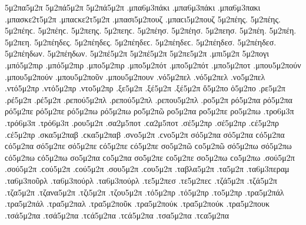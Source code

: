 {5μ2πα5μ2π   %
5μ2πά5μ2π 5μ2πά5μ2π   %
.μπα6μ3πάκι .μπα6μ3πάκι   %
.μπα6μ3πακι
.μπασκε2τ5μ2π .μπαϲκε2τ5μ2π   %
.μπασι5μ2πουζ .μπαϲι5μ2πουζ   %
5μ2πέης. 5μ2πέης. 5μ2πέηϲ. 5μ2πέηϲ.   %
5μ2πεης. 5μ2πεηϲ.
5μ2πέησ. 5μ2πέησ.
5μ2πεησ.
5μ2πέη. 5μ2πέη.
5μ2πεη.
5μ2πέηδες. 5μ2πέηδες. 5μ2πέηδεϲ. 5μ2πέηδεϲ.
5μ2πέηδεσ. 5μ2πέηδεσ.
5μ2πέηδων. 5μ2πέηδων.
5μ2πέ5μ2π 5μ2πέ5μ2π   %
5μ2πε5μ2π
.μπι5μ2π   %
5μ2πογι   %
.μπό5μ2πιρ .μπό5μ2πιρ   %
.μπο5μ2πιρ   %
.μπο5μ2πότ .μπο5μ2πότ   %
.μπο5μ2ποτ
.μπου5μ2πούν .μπου5μ2πούν   %
.μπου5μ2ποῦν
.μπου5μ2πουν
.νό5μ2πελ .νό5μ2πελ   %
.νο5μ2πελ
.ντό5μ2πρ .ντό5μ2πρ   %
.ντο5μ2πρ
.ξε5μ2π   %
.ξέ5μ2π .ξέ5μ2π
ὄ5μ2πο   %
ὀ5μ2πο
.ρε5μ2π   %
.ρέ5μ2π .ρέ5μ2π   %
.ρεπού5μ2πλ .ρεπού5μ2πλ   %
.ρεπου5μ2πλ   %
.ρο5μ2π   %
ρό5μ2πα ρό5μ2πα   %
ρό5μ2πε ρό5μ2πε
ρό5μ2πω ρό5μ2πω
ρο5μ2πῶ
ρο5μ2πα
ρο5μ2πε
ρο5μ2πω
.τρο6μ3π   %
.τρό6μ3π .τρό6μ3π   %
.ρου5μ2π   %
.σα2μ5ποτ .ϲα2μ5ποτ   %
.σέ5μ2πρ .σέ5μ2πρ .ϲέ5μ2πρ .ϲέ5μ2πρ   %
.σκα5μ2παβ .ϲκα5μ2παβ   %
.σνο5μ2π .ϲνο5μ2π   %
σό5μ2πα σό5μ2πα ϲό5μ2πα ϲό5μ2πα   %
σό5μ2πε σό5μ2πε ϲό5μ2πε ϲό5μ2πε
σο5μ2πῶ ϲο5μ2πῶ
σό5μ2πω σό5μ2πω ϲό5μ2πω ϲό5μ2πω
σο5μ2πα ϲο5μ2πα
σο5μ2πε ϲο5μ2πε
σο5μ2πω ϲο5μ2πω
.σού5μ2π .σού5μ2π .ϲού5μ2π .ϲού5μ2π   %
.σου5μ2π .ϲου5μ2π
.ταβλα5μ2π   %
.τα5μ2π   %
.τα6μ3περαμ   %
.τα6μ3ποῦρλ   %
.τα6μ3πούρλ .τα6μ3πούρλ
.τε5μ2πεσ .τε5μ2πεϲ   %
.τζά5μ2π .τζά5μ2π   %
.τζα5μ2π
.τζανα5μ2π   %
.τζι5μ2π   %
.τζου5μ2π   %
.τό5μ2πρ .τό5μ2πρ   %
.το5μ2πρ
.τρα5μ2πάλ .τρα5μ2πάλ   %
.τρα5μ2παλ
.τρα5μ2ποῦκ   %
.τρα5μ2πούκ .τρα5μ2πούκ
.τρα5μ2πουκ
.τσά5μ2πα .τσά5μ2πα .τϲά5μ2πα .τϲά5μ2πα   %
.τσα5μ2πα .τϲα5μ2πα
}
